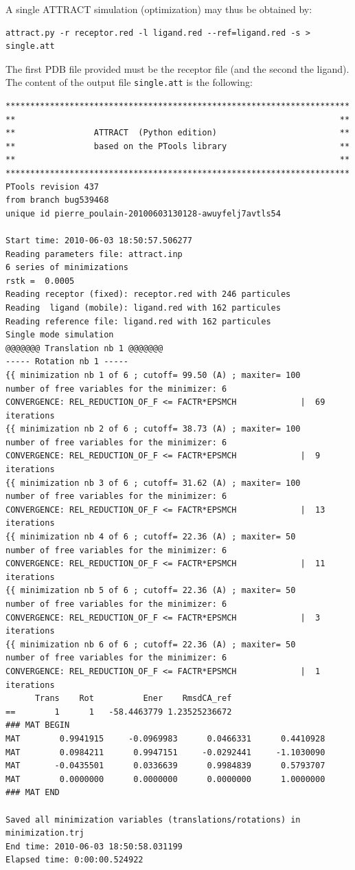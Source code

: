 \documentclass[12pt,a4paper]{article}
\begin{document}
A single ATTRACT simulation (optimization) may thus be obtained by:
\begin{verbatim}
attract.py -r receptor.red -l ligand.red --ref=ligand.red -s > single.att
\end{verbatim}

The first PDB file provided must be the receptor file (and the second the ligand).
The content of the output file {\tt single.att} is the following:

\newpage
\linenumbers*
\begin{verbatim}
**********************************************************************
**                                                                  **
**                ATTRACT  (Python edition)                         **
**                based on the PTools library                       **
**                                                                  **
**********************************************************************
PTools revision 437
from branch bug539468
unique id pierre_poulain-20100603130128-awuyfelj7avtls54

Start time: 2010-06-03 18:50:57.506277
Reading parameters file: attract.inp
6 series of minimizations
rstk =  0.0005
Reading receptor (fixed): receptor.red with 246 particules
Reading  ligand (mobile): ligand.red with 162 particules
Reading reference file: ligand.red with 162 particules
Single mode simulation
@@@@@@@ Translation nb 1 @@@@@@@
----- Rotation nb 1 -----
{{ minimization nb 1 of 6 ; cutoff= 99.50 (A) ; maxiter= 100
number of free variables for the minimizer: 6
CONVERGENCE: REL_REDUCTION_OF_F <= FACTR*EPSMCH             |  69 iterations
{{ minimization nb 2 of 6 ; cutoff= 38.73 (A) ; maxiter= 100
number of free variables for the minimizer: 6
CONVERGENCE: REL_REDUCTION_OF_F <= FACTR*EPSMCH             |  9 iterations
{{ minimization nb 3 of 6 ; cutoff= 31.62 (A) ; maxiter= 100
number of free variables for the minimizer: 6
CONVERGENCE: REL_REDUCTION_OF_F <= FACTR*EPSMCH             |  13 iterations
{{ minimization nb 4 of 6 ; cutoff= 22.36 (A) ; maxiter= 50
number of free variables for the minimizer: 6
CONVERGENCE: REL_REDUCTION_OF_F <= FACTR*EPSMCH             |  11 iterations
{{ minimization nb 5 of 6 ; cutoff= 22.36 (A) ; maxiter= 50
number of free variables for the minimizer: 6
CONVERGENCE: REL_REDUCTION_OF_F <= FACTR*EPSMCH             |  3 iterations
{{ minimization nb 6 of 6 ; cutoff= 22.36 (A) ; maxiter= 50
number of free variables for the minimizer: 6
CONVERGENCE: REL_REDUCTION_OF_F <= FACTR*EPSMCH             |  1 iterations
      Trans    Rot          Ener    RmsdCA_ref
==        1      1   -58.4463779 1.23525236672
### MAT BEGIN
MAT        0.9941915     -0.0969983      0.0466331      0.4410928 
MAT        0.0984211      0.9947151     -0.0292441     -1.1030090 
MAT       -0.0435501      0.0336639      0.9984839      0.5793707 
MAT        0.0000000      0.0000000      0.0000000      1.0000000 
### MAT END

Saved all minimization variables (translations/rotations) in minimization.trj
End time: 2010-06-03 18:50:58.031199
Elapsed time: 0:00:00.524922
\end{verbatim}
\nolinenumbers
\end{document}
